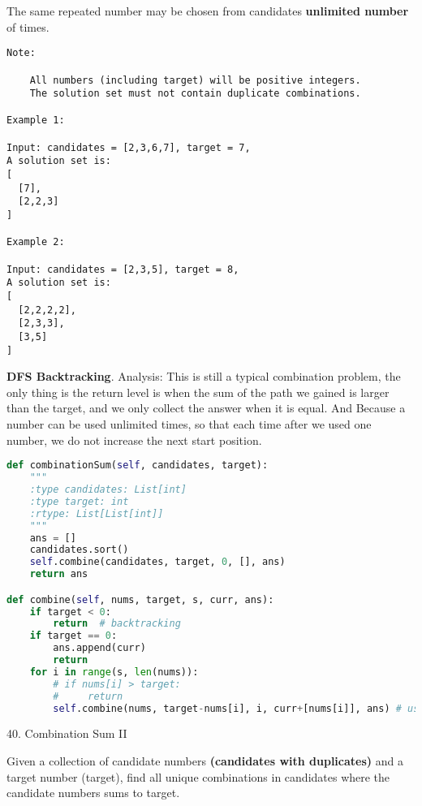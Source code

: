 \documentclass[../../question_3_array_question.tex]{subfiles}
\begin{document}
The same repeated number may be chosen from candidates \textbf{unlimited number} of times.
\begin{lstlisting}
Note:

    All numbers (including target) will be positive integers.
    The solution set must not contain duplicate combinations.

Example 1:

Input: candidates = [2,3,6,7], target = 7,
A solution set is:
[
  [7],
  [2,2,3]
]

Example 2:

Input: candidates = [2,3,5], target = 8,
A solution set is:
[
  [2,2,2,2],
  [2,3,3],
  [3,5]
]
\end{lstlisting}
\textbf{DFS Backtracking}. Analysis: This is still a typical combination problem, the only thing is the return level is when the sum of the path we gained is larger than the target, and we only collect the answer when it is equal. And Because a number can be used unlimited times, so that each time after we used one number, we do not increase the next start position. 
\begin{lstlisting}[language=Python]
def combinationSum(self, candidates, target):
    """
    :type candidates: List[int]
    :type target: int
    :rtype: List[List[int]]
    """
    ans = []
    candidates.sort()
    self.combine(candidates, target, 0, [], ans)
    return ans

def combine(self, nums, target, s, curr, ans):
    if target < 0:
        return  # backtracking
    if target == 0:
        ans.append(curr)
        return 
    for i in range(s, len(nums)):
        # if nums[i] > target:
        #     return
        self.combine(nums, target-nums[i], i, curr+[nums[i]], ans) # use i, instead of i+1 because we can reuse
\end{lstlisting}
40. Combination Sum II

Given a collection of candidate numbers \textbf{(candidates with duplicates)} and a target number (target), find all unique combinations in candidates where the candidate numbers sums to target.
\end{document}
